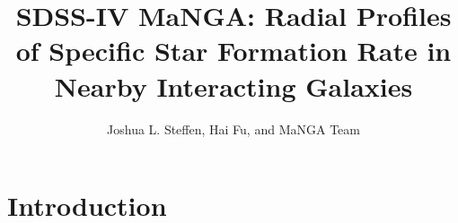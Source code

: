 \documentclass[iop,revtex4,twocolumn,apj,numberedappendix,appendixfloats]{emulateapj}
\begin{document}
\title{SDSS-IV MaNGA: Radial Profiles of Specific Star Formation Rate in Nearby Interacting Galaxies}

\author{
Joshua L. Steffen, 
Hai Fu, and 
MaNGA Team 
}

\begin{abstract}

\end{abstract}


\section{Introduction}\label{sec:intro}



\end{document}
